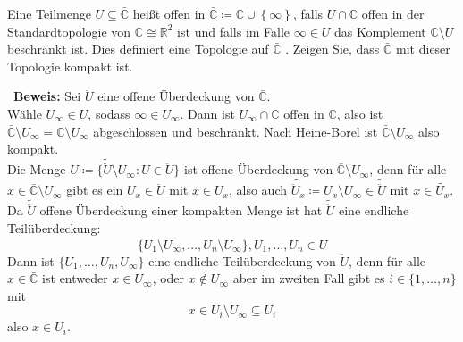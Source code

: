 \begin{problem}[1]

\begin{assignment}
 Eine Teilmenge $ U \subseteq \bar{\mathbb{C}} $ heißt offen in $\bar{\mathbb{C}} \coloneqq \mathbb{C} \cup \left\{ \infty \right\}$, falls $U \cap \mathbb{C}$ offen in der Standardtopologie von $\mathbb{C} \cong \mathbb{R}^2$ ist und falls im Falle $\infty \in U$ das Komplement $\mathbb{C} \setminus U$ beschränkt ist. Dies definiert eine Topologie auf $\bar{\mathbb{C}} $ .
 Zeigen Sie, dass $\bar{\mathbb{C}} $ mit dieser Topologie kompakt ist.
\end{assignment}
\begin{solution}
 \
  \textbf{Beweis:} Sei \( \ddot{U} \) eine offene Überdeckung von \( \bar{\mathbb{C}} \). \\
  Wähle \( U_{\infty} \in U \), sodass \( \infty \in U_{\infty} \). Dann ist \( U_{\infty} \cap \mathbb{C} \) offen in \( \mathbb{C} \), also ist \( \bar{\mathbb{C}} \setminus U_{\infty} = \mathbb{C} \setminus U_{\infty} \) abgeschlossen und beschränkt. Nach Heine-Borel ist \( \bar{\mathbb{C}} \setminus U_{\infty} \) also kompakt. \\
  Die Menge \( U \coloneqq \{ \tilde{\ddot{U}} \setminus U_{\infty} : U \in \ddot{U} \} \) ist offene Überdeckung von \( \bar{\mathbb{C}} \setminus U_{\infty} \), denn für alle \( x \in \bar{\mathbb{C}} \setminus U_{\infty} \) gibt es ein \( U_x \in \ddot{U} \) mit \( x \in U_x \), also auch \( \tilde{\ddot{U}_x} \coloneqq U_x \setminus U_{\infty} \in \tilde{\ddot{U}} \) mit \( x \in \tilde{U_x}. \) \\
  Da \( \tilde{\ddot{U}} \) offene Überdeckung einer kompakten Menge ist hat \( \tilde{\ddot{U}} \) eine endliche Teilüberdeckung: 
  \begin{equation*}
    \{ U_1 \setminus U_{\infty}, \dots, U_n \setminus U_{\infty} \}, U_1, \dots, U_n \in \ddot{U}
  \end{equation*}
  Dann ist \( \{ U_1, \dots, U_n, U_{\infty} \} \) eine endliche Teilüberdeckung von \( \ddot{U} \), denn für alle
  \( x \in \bar{\mathbb{C}} \) ist entweder \( x \in U_{\infty} \), oder \( x \notin U_{\infty} \) aber im zweiten Fall gibt es \( i \in \{ 1, \dots, n \} \) mit 
  \begin{equation*}
    x \in U_i \setminus U_{\infty} \subseteq U_i
  \end{equation*} 
  also \( x \in U_i \).  
\end{solution}
\end{problem}

